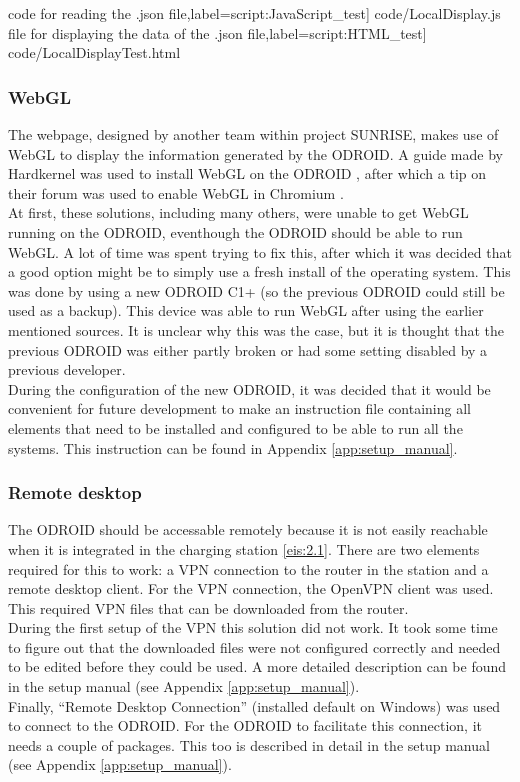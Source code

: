 \scriptsize
	 code for reading the .json file,label=script:JavaScript_test] {code/LocalDisplay.js}
	 file for displaying the data of the .json file,label=script:HTML_test] {code/LocalDisplayTest.html}
\normalsize

\subsubsection{WebGL}
The webpage, designed by another team within project SUNRISE, makes use of WebGL to display the information generated by the ODROID. A guide made by Hardkernel was used to install WebGL on the ODROID \cite{WebGL_guide}, after which a tip on their forum was used to enable WebGL in Chromium \cite{WebGL_forum}.\\

At first, these solutions, including many others, were unable to get WebGL running on the ODROID, eventhough the ODROID should be able to run WebGL. A lot of time was spent trying to fix this, after which it was decided that a good option might be to simply use a fresh install of the operating system. This was done by using a new ODROID C1+ (so the previous ODROID could still be used as a backup). This device was able to run WebGL after using the earlier mentioned sources. It is unclear why this was the case, but it is thought that the previous ODROID was either partly broken or had some setting disabled by a previous developer.\\

During the configuration of the new ODROID, it was decided that it would be convenient for future development to make an instruction file containing all elements that need to be installed and configured to be able to run all the systems. This instruction can be found in Appendix \ref{app:setup_manual}.

\subsubsection{Remote desktop}
The ODROID should be accessable remotely because it is not easily reachable when it is integrated in the charging station \ref{eis:2.1}. There are two elements required for this to work: a VPN connection to the router in the station and a remote desktop client. For the VPN connection, the OpenVPN  client \cite{openvpn} was used. This required VPN files that can be downloaded from the router.\\

During the first setup of the VPN this solution did not work. It took some time to figure out that the downloaded files were not configured correctly and needed to be edited before they could be used. A more detailed description can be found in the setup manual (see Appendix \ref{app:setup_manual}).\\

Finally, ``Remote Desktop Connection'' (installed default on Windows) was used to connect to the ODROID. For the ODROID to facilitate this connection, it needs a couple of packages. This too is described in detail in the setup manual (see Appendix \ref{app:setup_manual}).